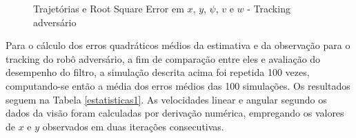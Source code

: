 \documentclass[paper=a4, fontsize=11pt]{scrartcl}
\begin{document}
\begin{figure}[!ht]
{    }
    \hfill
    \hfill
    \caption{Trajetórias e Root Square Error em $x$, $y$, $\psi$, $v$ e $w$ - Tracking adversário}
    \label{estatisticas_adversario}
  \end{figure}
  

  
Para o cálculo dos erros quadráticos médios da estimativa e da observação para o tracking do robô adversário, a fim de comparação entre eles e avaliação do desempenho do filtro, a simulação descrita acima foi repetida 100 vezes, computando-se então a média dos erros médios das 100 simulações. Os resultados seguem na Tabela \ref{estatisticas1}. As velocidades linear e angular segundo os dados da visão foram calculadas por derivação numérica, empregando os valores de $x$ e $y$ observados em duas iterações consecutivas.
\end{document}

